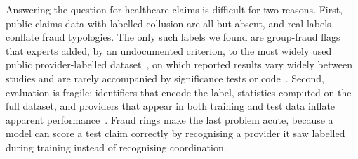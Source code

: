 \documentclass[pdflatex,sn-vancouver-num]{sn-jnl}
\begin{document}
Answering the question for healthcare claims is difficult for two reasons.
First, public claims data with labelled collusion are all but absent, and
real labels conflate fraud typologies. The only such labels we found are
group-fraud flags that experts added, by an undocumented criterion, to the most
widely used public provider-labelled dataset~\cite{ma2023rdpgl}, on which
reported results vary widely between studies and are rarely accompanied by
significance tests or code~\cite{curtis2025}. Second, evaluation is fragile:
identifiers that encode the label, statistics computed on the full dataset,
and providers that appear in both training and test data inflate apparent
performance~\cite{kaufman2012leakage,kapoor2023leakage}. Fraud rings make the
last problem acute, because a model can score a test claim correctly by
recognising a provider it saw labelled during training instead of
recognising coordination.
\end{document}
